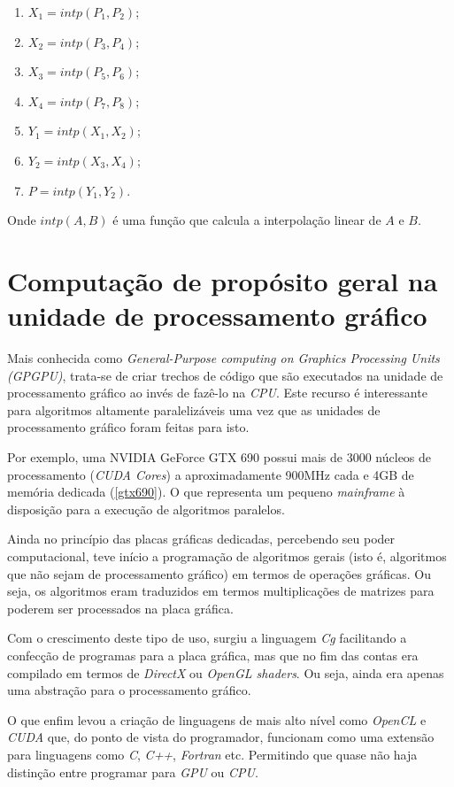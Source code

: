     \newpage
    \begin{enumerate}
      \item $X_{1} = intp(P_{1}, P_{2})$;
      \item $X_{2} = intp(P_{3}, P_{4})$;
      \item $X_{3} = intp(P_{5}, P_{6})$;
      \item $X_{4} = intp(P_{7}, P_{8})$;
      \item $Y_{1} = intp(X_{1}, X_{2})$;
      \item $Y_{2} = intp(X_{3}, X_{4})$;
      \item $P = intp(Y_{1}, Y_{2})$.
    \end{enumerate}
    
    Onde $intp(A,B)$ é uma função que calcula a interpolação linear de $A$ e $B$.

\section{Computação de propósito geral na unidade de processamento gráfico}
\label{gpgpu}
Mais conhecida como \textit{General-Purpose computing on Graphics Processing Units (GPGPU)}, trata-se de  criar trechos de código que são executados na unidade de processamento gráfico ao invés de fazê-lo na \textit{CPU}. Este recurso é interessante para algoritmos altamente paralelizáveis uma vez que as unidades de processamento gráfico foram feitas para isto.

Por exemplo, uma NVIDIA GeForce GTX 690 possui mais de 3000 núcleos de processamento (\textit{CUDA Cores}) a aproximadamente 900MHz cada e 4GB de memória dedicada (\ref{gtx690}). O que representa um pequeno \textit{mainframe} à disposição para a execução de algoritmos paralelos. 

Ainda no princípio das placas gráficas dedicadas, percebendo seu poder computacional, teve início a programação de algoritmos gerais (isto é, algoritmos que não sejam de processamento gráfico) em termos de operações gráficas. Ou seja, os algoritmos eram traduzidos em termos multiplicações de matrizes para poderem ser processados na placa gráfica.

Com o crescimento deste tipo de uso, surgiu a linguagem \textit{Cg} facilitando a confecção de programas para a placa gráfica, mas que no fim das contas era compilado em termos de \textit{DirectX} ou \textit{OpenGL shaders}. Ou seja, ainda era apenas uma abstração para o processamento gráfico.

O que enfim levou a criação de linguagens de mais alto nível como \textit{OpenCL} e \textit{CUDA} que, do ponto de vista do programador, funcionam como uma extensão para linguagens como \textit{C}, \textit{C++}, \textit{Fortran} etc. Permitindo que quase não haja distinção entre programar para \textit{GPU} ou \textit{CPU}.

